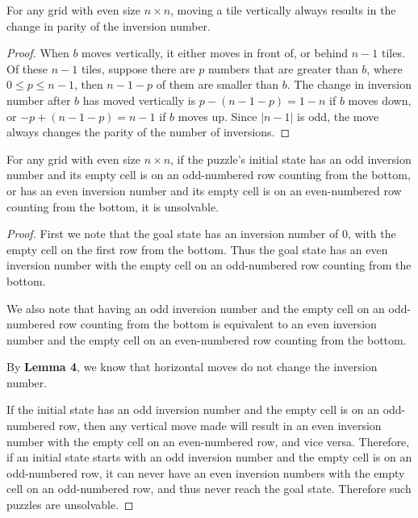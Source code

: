 \documentclass{llncs}
\begin{document}
\begin{lemma}
For any grid with even size $n \times n$, moving a tile vertically always results in the change in parity of the inversion number.
\end{lemma}

\begin{proof}
When $b$ moves vertically, it either moves in front of, or behind $n-1$ tiles. Of these $n-1$ tiles, suppose there are $p$ numbers that are greater than $b$, where $0 \leq p \leq n-1$, then $n-1-p$ of them are smaller than $b$. The change in inversion number after $b$ has moved vertically is $p-(n-1-p) = 1-n$ if $b$ moves down, or $-p + (n-1-p) = n-1$ if $b$ moves up. Since $|n-1|$ is odd, the move always changes the parity of the number of inversions.
\end{proof}

\begin{lemma}
For any grid with even size $n \times n$, if the puzzle's initial state has an odd inversion number and its empty cell is on an odd-numbered row counting from the bottom, or has an even inversion number and its empty cell is on an even-numbered row counting from the bottom, it is unsolvable.
\end{lemma}

\begin{proof}
First we note that the goal state has an inversion number of $0$, with the empty cell on the first row from the bottom. Thus the goal state has an even inversion number with the empty cell on an odd-numbered row counting from the bottom.

We also note that having an odd inversion number and the empty cell on an odd-numbered row counting from the bottom is equivalent to an even inversion number and the empty cell on an even-numbered row counting from the bottom.

By \textbf{Lemma 4}, we know that horizontal moves do not change the inversion number.

If the initial state has an odd inversion number and the empty cell is on an odd-numbered row, then any vertical move made will result in an even inversion number with the empty cell on an even-numbered row, and vice versa. Therefore, if an initial state starts with an odd inversion number and the empty cell is on an odd-numbered row, it can never have an even inversion numbers with the empty cell on an odd-numbered row, and thus never reach the goal state. Therefore such puzzles are unsolvable.
\end{proof}
\end{document}
